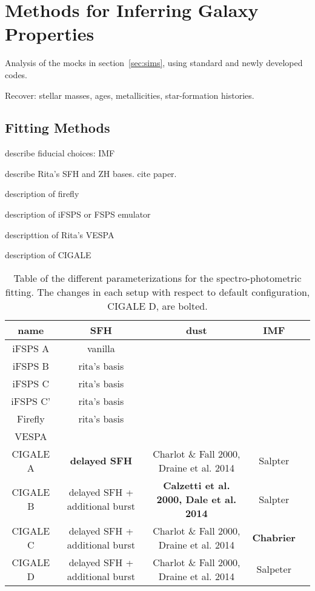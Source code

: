 \section{Methods for Inferring Galaxy Properties} \label{sec:methods}
Analysis of the mocks in section~\ref{sec:sims}, using standard and newly developed codes. 

Recover: stellar masses, ages, metallicities, star-formation histories. 

\subsection{Fitting Methods}
describe fiducial choices: IMF

describe Rita's SFH and ZH bases. cite paper.

description of firefly 

description of iFSPS or FSPS emulator 

descripttion of Rita's VESPA

description of CIGALE

\begin{table}
\caption{Table of the different parameterizations for the spectro-photometric fitting. The changes in each setup with respect to default configuration, CIGALE D, are bolted. } 
\begin{center} 
\begin{tabular}{ccccc} \toprule
name & SFH & dust & IMF \\[3pt]
\hline 
iFSPS A  & vanilla & & \\
iFSPS B  & rita's basis & & \\
iFSPS C  & rita's basis & & \\
iFSPS C' & rita's basis & & \\
Firefly  & rita's basis & & \\
VESPA    & & & \\
CIGALE A & \textbf{delayed SFH} & Charlot $\&$ Fall 2000, Draine et al. 2014 & Salpter \\
CIGALE B & delayed SFH + additional burst & \textbf{Calzetti et al. 2000, Dale et al. 2014} & Salpter \\
CIGALE C & delayed SFH + additional burst & Charlot $\&$ Fall 2000, Draine et al. 2014 & \textbf{Chabrier} \\
CIGALE D & delayed SFH + additional burst & Charlot $\&$ Fall 2000, Draine et al. 2014 & Salpeter \\[3pt]
\hline            
\end{tabular} \label{tab:setups}
\end{center}
\end{table}



